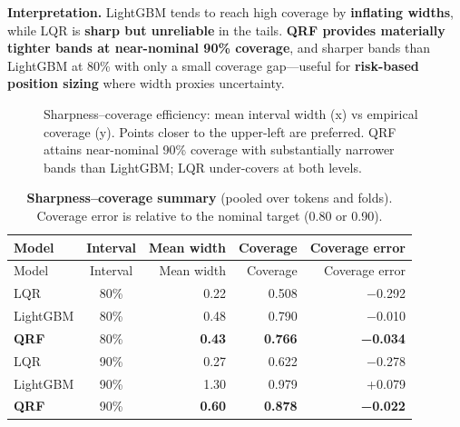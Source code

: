 \documentclass[
  a4paper,
  DIV=11,
  numbers=noendperiod]{scrreprt}
\begin{document}
\textbf{Interpretation.} LightGBM tends to reach high coverage by
\textbf{inflating widths}, while LQR is \textbf{sharp but unreliable} in
the tails. \textbf{QRF provides materially tighter bands at near-nominal
90\% coverage}, and sharper bands than LightGBM at 80\% with only a
small coverage gap---useful for \textbf{risk-based position sizing}
where width proxies uncertainty.

\begin{figure}


\caption{\label{fig-efficiency-scatter}Sharpness--coverage efficiency:
mean interval width (x) vs empirical coverage (y). Points closer to the
upper-left are preferred. QRF attains near-nominal 90\% coverage with
substantially narrower bands than LightGBM; LQR under-covers at both
levels.}

\end{figure}%

\begin{longtable}[]{@{}lcrrr@{}}
\caption{\textbf{Sharpness--coverage summary} (pooled over tokens and
folds). Coverage error is relative to the nominal target (0.80 or
0.90).}\label{tbl-efficiency-summary}\tabularnewline
\toprule\noalign{}
Model & Interval & Mean width & Coverage & Coverage error \\
\midrule\noalign{}
\endfirsthead
\toprule\noalign{}
Model & Interval & Mean width & Coverage & Coverage error \\
\midrule\noalign{}
\endhead
\bottomrule\noalign{}
\endlastfoot
LQR & 80\% & 0.22 & 0.508 & −0.292 \\
LightGBM & 80\% & 0.48 & 0.790 & −0.010 \\
\textbf{QRF} & 80\% & \textbf{0.43} & \textbf{0.766} &
\textbf{−0.034} \\
LQR & 90\% & 0.27 & 0.622 & −0.278 \\
LightGBM & 90\% & 1.30 & 0.979 & +0.079 \\
\textbf{QRF} & 90\% & \textbf{0.60} & \textbf{0.878} &
\textbf{−0.022} \\
\end{longtable}
\end{document}
